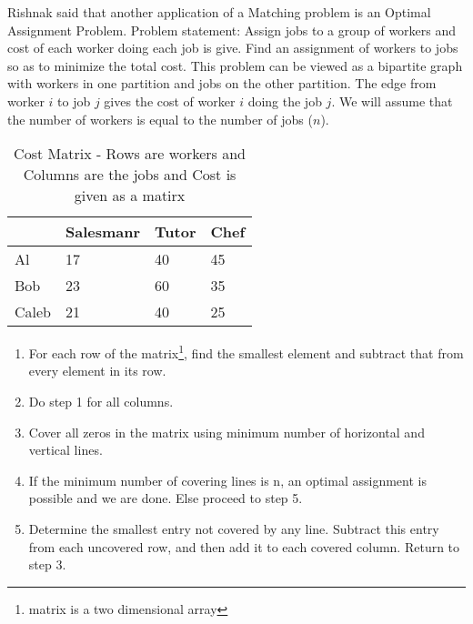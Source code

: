 Rishnak said that another application of a Matching problem is an Optimal Assignment Problem. 
Problem statement: Assign jobs to a group of workers and cost of each worker doing each job is give. Find an assignment of workers to jobs so as to minimize the total cost. This problem can be viewed as a bipartite graph with workers in one partition and jobs on the other partition. The edge from worker $i$ to job $j$ gives the cost of worker $i$ doing the job $j$.
We will assume that the number of workers is equal to the number of jobs ($n$).
\begin{table}
\begin{center}
\begin{tabular}{ ||p{2cm}||p{2cm}||p{1.5cm} ||p{1.5cm}|| }
 \hline
 
  & Salesmanr&Tutor&Chef\\
 \hline
 Al  & 17   &40&45\\
 Bob& 23&60&35\\
 Caleb&21&40&25\\

 
 \hline
\end{tabular}
\caption{Cost Matrix - Rows are workers and Columns are the jobs and Cost is given as a matirx }\label{16t3}
\end{center}
\end{table}

\begin{enumerate}
\item For each row of the matrix\footnote{matrix is a two dimensional array}, find the smallest element and subtract that from every element in its row.
\item Do step 1 for all columns.
\item Cover all zeros in the matrix using minimum number of horizontal  and vertical lines.
\item If the minimum number of covering lines is n, an optimal assignment is possible and we are done. Else  proceed to step 5.
\item Determine the smallest entry not covered by any line. Subtract this entry from each uncovered row, and then add it to each covered column. Return to step 3.
\end{enumerate}

